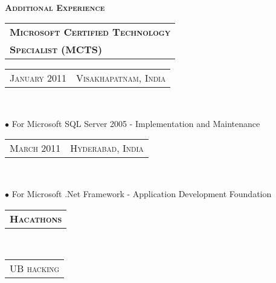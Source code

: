 \documentclass[10pt,letterpaper,oneside]{article}
\begin{document}
\begin{minipage}[t]{0.33\textwidth}
{        }
        \vspace{10pt}\\
        \textcolor{light-gray}{\textbf{\large A\textsc{dditional} E\textsc{xperience}}}
        \vspace{10pt}\\
        \begin{tabular}{l}
            \textbf{\normalsize M\textsc{icrosoft} C\textsc{ertified} T\textsc{echnology}}\\
            {\normalsize \textbf{S\textsc{pecialist} (MCTS)}}
        \end{tabular}
        \vspace{2pt}
        \textcolor{light-gray}{
            \begin{tabular}{c|c}
                {\small J\textsc{anuary 2011}}
                &{\small V\textsc{isakhapatnam}, I\textsc{ndia}}
            \end{tabular}
        }\\
        \vspace{-12pt}
        \begin{adjustwidth}{7pt}{0pt}
            {\footnotesize $\bullet$ For Microsoft SQL Server 2005 - Implementation and Maintenance}\\
        \end{adjustwidth}
        \vspace{-6pt} 
        \textcolor{light-gray}{
            \begin{tabular}{c|c}
                {\small M\textsc{arch 2011}}
                &{\small H\textsc{yderabad}, I\textsc{ndia}}
            \end{tabular}
        }\\
        \vspace{-12pt}
        \begin{adjustwidth}{7pt}{0pt}
        {\footnotesize $\bullet$ For Microsoft .Net Framework - Application Development Foundation}\\
        \end{adjustwidth}
        \begin{tabular}{c}
            \textbf{\normalsize H\textsc{acathons}}
        \end{tabular}\\
        \begin{tabular}{c}
            {\small UB\textsc{ hacking}}
        \end{tabular}\\
        \textcolor{light-gray}{
            \begin{tabular}{c|c}

\end{tabular}}
\end{minipage}
\end{document}
